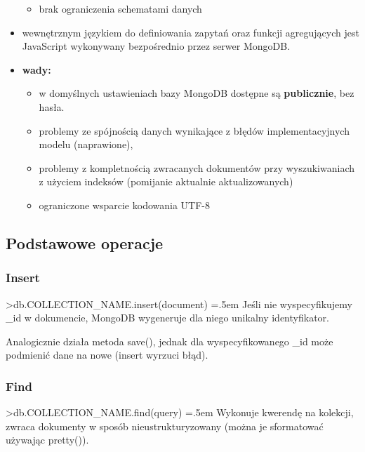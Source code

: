 \documentclass[a4paper]{article}
\newenvironment{lcverbatim}
{\SaveVerbatim{cverb}}
{\endSaveVerbatim
\flushleft\fboxrule=0pt\fboxsep=.5em
\colorbox{cverbbg}{%
\makebox[\dimexpr\linewidth-2\fboxsep][l]{\BUseVerbatim{cverb}}%
}
\endflushleft
}
\begin{document}
\begin{itemize}
\begin{itemize}
            \item brak ograniczenia schematami danych
        \end{itemize}
        \item wewnętrznym językiem do definiowania zapytań oraz funkcji agregujących jest JavaScript wykonywany bezpośrednio przez serwer MongoDB.
        \item \textbf{wady:}
        \begin{itemize}
            \item w domyślnych ustawieniach bazy MongoDB dostępne są \textbf{publicznie}, bez hasła.
            \item problemy ze spójnością danych wynikające z błędów implementacyjnych modelu (naprawione),
            \item problemy z kompletnością zwracanych dokumentów przy wyszukiwaniach z użyciem indeksów (pomijanie aktualnie aktualizowanych)
            \item ograniczone wsparcie kodowania UTF-8
        \end{itemize}
    \end{itemize}

    \subsection{Podstawowe operacje}
    \subsubsection{Insert}
    \begin{lcverbatim}
        >db.COLLECTION_NAME.insert(document)
    \end{lcverbatim}
    Jeśli nie wyspecyfikujemy \_id w dokumencie, MongoDB wygeneruje dla niego unikalny identyfikator.

    Analogicznie działa metoda save(), jednak dla wyspecyfikowanego \_id może podmienić dane na nowe (insert wyrzuci błąd).

    \subsubsection{Find}
    \begin{lcverbatim}
        >db.COLLECTION_NAME.find(query)
    \end{lcverbatim}
    Wykonuje kwerendę na kolekcji, zwraca dokumenty w sposób nieustrukturyzowany (można je sformatować używając pretty()).
\end{document}

